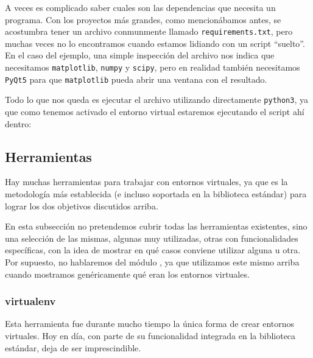 A veces es complicado saber cuales son las dependencias que necesita un programa. Con los proyectos más grandes, como mencionábamos antes, se acostumbra tener un archivo conmunmente llamado \texttt{requirements.txt}, pero muchas veces no lo encontramos cuando estamos lidiando con un script ``suelto''. En el caso del ejemplo, una simple inspección del archivo nos indica que necesitamos \texttt{matplotlib}, \texttt{numpy} y \texttt{scipy}, pero en realidad también necesitamos \texttt{PyQt5} para que \texttt{matplotlib} pueda abrir una ventana con el resultado.

Todo lo que nos queda es ejecutar el archivo utilizando directamente \texttt{python3}, ya que como tenemos activado el entorno virtual estaremos ejecutando el script ahí dentro:



\subsection{Herramientas} \label{sub:venvs-herramientas}

Hay muchas herramientas para trabajar con entornos virtuales, ya que es la metodología más establecida (e incluso soportada en la biblioteca estándar) para lograr los dos objetivos discutidos arriba.

En esta subsección no pretendemos cubrir todas las herramientas existentes, sino una selección de las mismas, algunas muy utilizadas, otras con funcionalidades específicas, con la idea de mostrar en qué casos conviene utilizar alguna u otra. Por supuesto, no hablaremos del módulo , ya que utilizamos este mismo arriba cuando mostramos genéricamente qué eran los entornos virtuales.

\subsubsection{virtualenv}

Esta herramienta fue durante mucho tiempo la única forma de crear entornos virtuales. Hoy en día, con parte de su funcionalidad integrada en la biblioteca estándar, deja de ser imprescindible.

